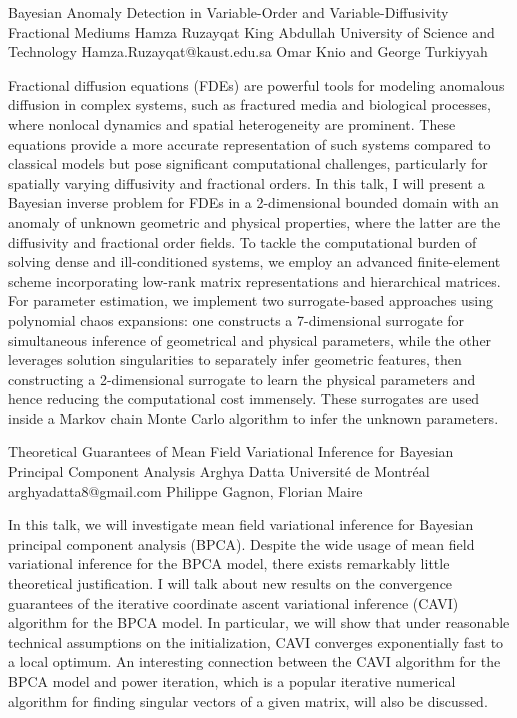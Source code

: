 \begin{talk}
  {Bayesian Anomaly Detection in Variable-Order and Variable-Diffusivity Fractional Mediums}%
  {Hamza Ruzayqat}%
  {King Abdullah University of Science and Technology}%
  {Hamza.Ruzayqat@kaust.edu.sa}%
  {Omar Knio and George Turkiyyah }%
  
    
   
Fractional diffusion equations (FDEs) are powerful tools for modeling anomalous diffusion in complex systems, such as fractured media and biological processes, where nonlocal dynamics and spatial heterogeneity are prominent. These equations provide a more accurate representation of such systems compared to classical models but pose significant computational challenges, particularly for spatially varying diffusivity and fractional orders. In this talk, I will present a Bayesian inverse problem for FDEs in a 2-dimensional bounded domain with an anomaly of unknown geometric and physical properties, where the latter are the diffusivity and fractional order fields. To tackle the computational burden of solving dense and ill-conditioned systems, we employ an advanced finite-element scheme incorporating low-rank matrix representations and hierarchical matrices. For parameter estimation, we implement two surrogate-based approaches using polynomial chaos expansions: one constructs a 7-dimensional surrogate for simultaneous inference of geometrical and physical parameters, while the other leverages solution singularities to separately infer geometric features, then constructing a 2-dimensional surrogate to learn the physical parameters and hence reducing the computational cost immensely. These surrogates are used inside a Markov chain Monte Carlo algorithm to infer the unknown parameters.

\medskip

\end{talk}

\begin{talk}
  {Theoretical Guarantees of Mean Field Variational Inference for Bayesian Principal Component Analysis}%
  {Arghya Datta}%
  {Universit\'e de Montr\'eal}%
  {arghyadatta8@gmail.com}%
  {Philippe Gagnon, Florian Maire}%
  
    
   
In this talk, we will investigate mean field variational inference for Bayesian principal component analysis (BPCA). Despite the wide usage of mean field variational inference for the BPCA model, there exists remarkably little theoretical justification. I will talk about new results on the convergence guarantees of the iterative coordinate ascent variational inference (CAVI) algorithm for the BPCA model. In particular, we will show that under reasonable technical assumptions on the initialization, CAVI converges exponentially fast to a local optimum. An interesting connection between the CAVI algorithm for the BPCA model and power iteration, which is a popular iterative numerical algorithm for finding singular vectors of a given matrix, will also be discussed.


\end{talk}

